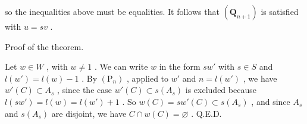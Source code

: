 so the inequalities above must be equalities. It follows that \((\mathbf{Q}_{n + 1})\) is satisfied with \(u = sv\) .

Proof of the theorem.

Let \(w \in W\) , with \(w \neq 1\) . We can write \(w\) in the form \(sw'\) with \(s \in S\) and \(l(w') = l(w) - 1\) . By \((\mathrm{P}_n)\) , applied to \(w'\) and \(n = l(w')\) , we have \(w'(C) \subset A_s\) , since the case \(w'(C) \subset s(A_s)\) is excluded because \(l(sw') = l(w) = l(w') + 1\) . So \(w(C) = sw'(C) \subset s(A_s)\) , and since \(A_s\) and \(s(A_s)\) are disjoint, we have \(C \cap w(C) = \varnothing\) . Q.E.D.

